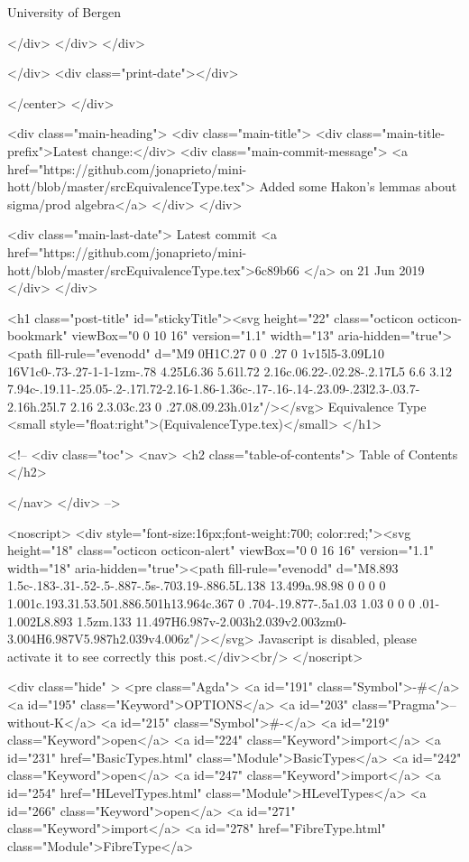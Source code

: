                   University of Bergen
                
                </div>
            </div>
          </div>
          
          
        </div>
        <div class="print-date"></div>
        
        
    </center>
  </div>

  
  <div class="main-heading">
    <div class="main-title">
      <div class="main-title-prefix">Latest change:</div>
      <div class="main-commit-message">
            <a href="https://github.com/jonaprieto/mini-hott/blob/master/srcEquivalenceType.tex">
              Added some Hakon's lemmas about sigma/prod algebra</a>
      </div>
    </div>

    <div class="main-last-date">
      Latest commit <a href="https://github.com/jonaprieto/mini-hott/blob/master/srcEquivalenceType.tex">6c89b66 </a> on  21 Jun 2019
    </div>
  </div>
  

  <h1 class="post-title" id="stickyTitle"><svg height="22" class="octicon octicon-bookmark" viewBox="0 0 10 16" version="1.1" width="13" aria-hidden="true"><path fill-rule="evenodd" d="M9 0H1C.27 0 0 .27 0 1v15l5-3.09L10 16V1c0-.73-.27-1-1-1zm-.78 4.25L6.36 5.61l.72 2.16c.06.22-.02.28-.2.17L5 6.6 3.12 7.94c-.19.11-.25.05-.2-.17l.72-2.16-1.86-1.36c-.17-.16-.14-.23.09-.23l2.3-.03.7-2.16h.25l.7 2.16 2.3.03c.23 0 .27.08.09.23h.01z"/></svg> Equivalence Type <small style="float:right">(EquivalenceType.tex)</small>
  </h1>

  <!-- 
  <div class="toc">
    <nav>
    <h2 class="table-of-contents"> Table of Contents </h2>
      

    </nav>
  </div>
   -->

  <noscript>
  <div style="font-size:16px;font-weight:700; color:red;"><svg height="18" class="octicon octicon-alert" viewBox="0 0 16 16" version="1.1" width="18" aria-hidden="true"><path fill-rule="evenodd" d="M8.893 1.5c-.183-.31-.52-.5-.887-.5s-.703.19-.886.5L.138 13.499a.98.98 0 0 0 0 1.001c.193.31.53.501.886.501h13.964c.367 0 .704-.19.877-.5a1.03 1.03 0 0 0 .01-1.002L8.893 1.5zm.133 11.497H6.987v-2.003h2.039v2.003zm0-3.004H6.987V5.987h2.039v4.006z"/></svg> Javascript is disabled, please activate it to see correctly this post.</div><br/>
  </noscript>

  <div class="hide" >
<pre class="Agda">
<a id="191" class="Symbol">{-#</a> <a id="195" class="Keyword">OPTIONS</a> <a id="203" class="Pragma">--without-K</a> <a id="215" class="Symbol">#-}</a>
<a id="219" class="Keyword">open</a> <a id="224" class="Keyword">import</a> <a id="231" href="BasicTypes.html" class="Module">BasicTypes</a>
<a id="242" class="Keyword">open</a> <a id="247" class="Keyword">import</a> <a id="254" href="HLevelTypes.html" class="Module">HLevelTypes</a>
<a id="266" class="Keyword">open</a> <a id="271" class="Keyword">import</a> <a id="278" href="FibreType.html" class="Module">FibreType</a>

